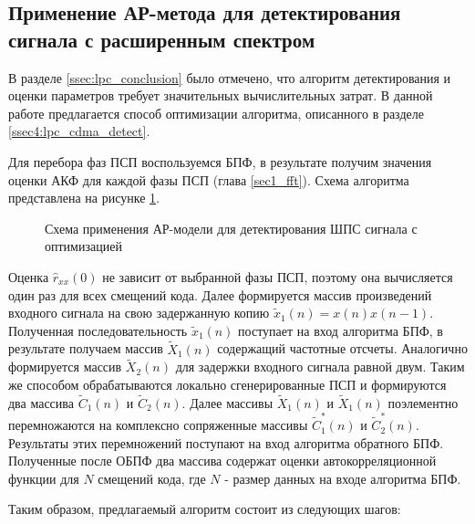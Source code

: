 \subsection{Применение АР-метода для детектирования сигнала с расширенным спектром}
\label{l:sec3_lpc_dma}

В разделе \ref{ssec:lpc_conclusion} было отмечено, что алгоритм детектирования и оценки параметров
требует значительных вычислительных затрат. В данной работе предлагается способ оптимизации алгоритма,
описанного в разделе \ref{ssec4:lpc_cdma_detect}.

Для перебора фаз ПСП воспользуемся БПФ, в результате получим значения оценки АКФ для каждой фазы ПСП (глава \ref{sec1_fft}).
Схема алгоритма представлена на рисунке \ref{pic:lpc_basic2}. 

\begin{figure}[H]
	\center{}
	\caption{Схема применения АР-модели для детектирования ШПС сигнала с оптимизацией}
	\label{pic:lpc_basic2}
\end{figure}

Оценка ${\hat{r}_{xx}(0)}$ не зависит от выбранной фазы ПСП, поэтому она вычисляется один
раз для всех смещений кода. Далее формируется массив произведений входного сигнала на
свою задержанную копию ${\tilde{x}_1(n)=x(n)x(n-1)}$. Полученная последовательность  
${\tilde{x}_1(n)}$ поступает на вход алгоритма БПФ, в результате получаем массив ${\tilde{X}_1(n)}$
содержащий частотные отсчеты. Аналогично формируется массив  ${\tilde{X}_2(n)}$ для
задержки входного сигнала равной двум. Таким же способом обрабатываются локально
сгенерированные ПСП и формируются два массива ${\tilde{C}_1(n)}$ и ${\tilde{C}_2(n)}$.
Далее массивы ${\tilde{X}_1(n)}$ и ${\tilde{X}_1(n)}$ поэлементно перемножаются
на комплексно сопряженные массивы ${\tilde{C}_1^*(n)}$ и ${\tilde{C}_2^*(n)}$.
Результаты этих перемножений поступают на вход алгоритма обратного
БПФ. Полученные после ОБПФ два массива содержат оценки автокорреляционной функции для ${N}$ 
смещений кода, где  ${N}$ - размер данных на входе алгоритма БПФ.

Таким образом, предлагаемый алгоритм состоит из следующих шагов:

